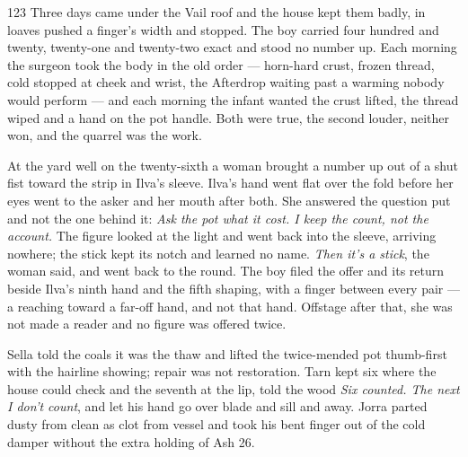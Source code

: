 
\scenebreak


\scenebreak


\scenebreak

\CRtailpiece
\begin{CRchronicle}{123}
Three days came under the Vail roof and the house kept them badly, in loaves pushed a finger’s width and stopped. The boy carried four hundred and twenty, twenty-one and twenty-two exact and stood no number up. Each morning the surgeon took the body in the old order — horn-hard crust, frozen thread, cold stopped at cheek and wrist, the Afterdrop waiting past a warming nobody would perform — and each morning the infant wanted the crust lifted, the thread wiped and a hand on the pot handle. Both were true, the second louder, neither won, and the quarrel was the work.

At the yard well on the twenty-sixth a woman brought a number up out of a shut fist toward the strip in Ilva’s sleeve. Ilva’s hand went flat over the fold before her eyes went to the asker and her mouth after both. She answered the question put and not the one behind it: \emph{Ask the pot what it cost. I keep the count, not the account.} The figure looked at the light and went back into the sleeve, arriving nowhere; the stick kept its notch and learned no name. \emph{Then it’s a stick}, the woman said, and went back to the round. The boy filed the offer and its return beside Ilva’s ninth hand and the fifth shaping, with a finger between every pair — a reaching toward a far-off hand, and not that hand. Offstage after that, she was not made a reader and no figure was offered twice.

Sella told the coals it was the thaw and lifted the twice-mended pot thumb-first with the hairline showing; repair was not restoration. Tarn kept six where the house could check and the seventh at the lip, told the wood \emph{Six counted. The next I don’t count}, and let his hand go over blade and sill and away. Jorra parted dusty from clean as clot from vessel and took his bent finger out of the cold damper without the extra holding of Ash 26.


\end{CRchronicle}
